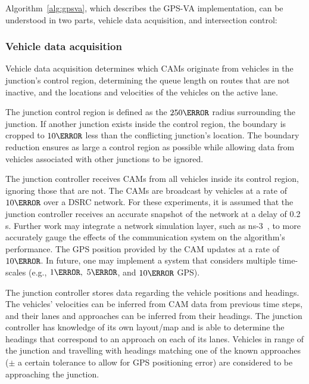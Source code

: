 \documentclass[numbered]{trbunofficial}
\begin{document}
Algorithm~\ref{alg:gpsva}, which describes the GPS-VA implementation, can be understood in two parts, vehicle data acquisition, and intersection control:

\subsubsection{Vehicle data acquisition}
Vehicle data acquisition determines which CAMs originate from vehicles in the junction's control region, determining the queue length on routes that are not inactive, and the locations and velocities of the vehicles on the active lane.

The junction control region is defined as the $250\m$ radius surrounding the junction. If another junction exists inside the control region, the boundary is cropped to $10\m$ less than the conflicting junction's location. The boundary reduction ensures as large a control region as possible while allowing data from vehicles associated with other junctions to be ignored. 

The junction controller receives CAMs from all vehicles inside its control region, ignoring those that are not. The CAMs are broadcast by vehicles at a rate of $10\Hz$ over a DSRC network. For these experiments, it is assumed that the junction controller receives an accurate snapshot of the network at a delay of 0.2 s. Further work may integrate a network simulation layer, such as ns-3~\cite{Riley2010}, to more accurately gauge the effects of the communication system on the algorithm's performance. The GPS position provided by the CAM updates at a rate of $10\Hz$. In future, one may implement a system that considers multiple time-scales (e.g., $1\Hz,\ 5\Hz$, and $10\Hz$ GPS).

The junction controller stores data regarding the vehicle positions and headings. The vehicles' velocities can be inferred from CAM data from previous time steps, and their lanes and approaches can be inferred from their headings. The junction controller has knowledge of its own layout/map and is able to determine the headings that correspond to an approach on each of its lanes. Vehicles in range of the junction and travelling with headings matching one of the known approaches ($\pm$ a certain tolerance to allow for GPS positioning error) are considered to be approaching the junction.
\end{document}

